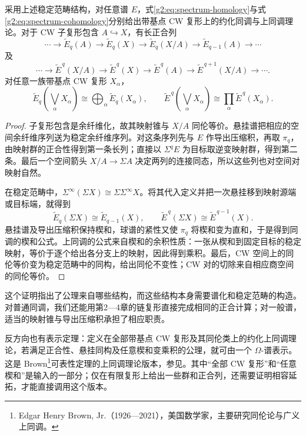 \begin{proposition}\label{g2:prop:spectrum-exact-wedge}
	采用上述稳定范畴结构，对任意谱 \(E\)，式\eqref{g2:eq:spectrum-homology}与式\eqref{g2:eq:spectrum-cohomology}分别给出带基点 CW 复形上的约化同调与上同调理论。对于 CW 子复形包含 \(A\hookrightarrow X\)，有长正合列
	\[
		\cdots\longrightarrow\widetilde E_q(A)\longrightarrow\widetilde E_q(X)
		\longrightarrow\widetilde E_q(X/A)\longrightarrow\widetilde E_{q-1}(A)\longrightarrow\cdots
	\]
	及
	\[
		\cdots\longrightarrow\widetilde E^{\,q}(X/A)\longrightarrow\widetilde E^{\,q}(X)
		\longrightarrow\widetilde E^{\,q}(A)\longrightarrow\widetilde E^{\,q+1}(X/A)\longrightarrow\cdots.
	\]
	对任意一族带基点 CW 复形 \(X_\alpha\)，
	\[
		\widetilde E_q\left(\bigvee_\alpha X_\alpha\right)
		\cong\bigoplus_\alpha\widetilde E_q(X_\alpha),\qquad
		\widetilde E^{\,q}\left(\bigvee_\alpha X_\alpha\right)
		\cong\prod_\alpha\widetilde E^{\,q}(X_\alpha).
	\]
\end{proposition}
\begin{proof}
	子复形包含是余纤维化，故其映射锥与 \(X/A\) 同伦等价。悬挂谱把相应的空间余纤维序列送为稳定余纤维序列。对这条序列先与 \(E\) 作导出压缩积，再取 \(\pi_q\)，由映射群的正合性得到第一条长列；直接以 \(\Sigma^qE\) 为目标取逆变映射群，得到第二条。最后一个空间箭头 \(X/A\to\Sigma A\) 决定两列的连接同态，所以这些列也对空间对映射自然。

	在稳定范畴中，\(\Sigma^\infty(\Sigma X)\cong\Sigma\Sigma^\infty X\)。将其代入定义并把一次悬挂移到映射源端或目标端，就得到
	\[
		\widetilde E_q(\Sigma X)\cong\widetilde E_{q-1}(X),\qquad
		\widetilde E^{\,q}(\Sigma X)\cong\widetilde E^{\,q-1}(X).
	\]
	悬挂谱及导出压缩积保持楔和，球谱的紧性又使 \(\pi_q\) 将楔和变为直和，于是得到同调的楔和公式。上同调的公式来自楔和的余积性质：一张从楔和到固定目标的稳定映射，等价于逐个给出各分支上的映射，因此得到乘积。最后，CW 空间上的同伦等价变为稳定范畴中的同构，给出同伦不变性；CW 对的切除来自相应商空间的同伦等价。
\end{proof}

这个证明指出了公理来自哪些结构，而这些结构本身需要谱化和稳定范畴的构造。对普通同调，我们还能用第2—4章的链复形直接完成相同的正合计算；对一般谱，适当的映射锥与导出压缩积承担了相应职责。

\ProseParagraphBreak

反方向也有表示定理：定义在全部带基点 CW 复形及其同伦类上的约化上同调理论，若满足正合性、悬挂同构及任意楔和变乘积的公理，就可由一个 \(\Omega\)-谱表示。这是 Brown\footnote{Edgar Henry Brown, Jr.（1926—2021），美国数学家，主要研究同伦论与广义上同调。}可表性定理的上同调理论版本，参见\cite[第22章第2节]{May1999}。其中“全部 CW 复形”和“任意楔和”是输入的一部分；仅在有限复形上给出一些群和正合列，还需要证明相容延拓，才能直接调用这个版本。

